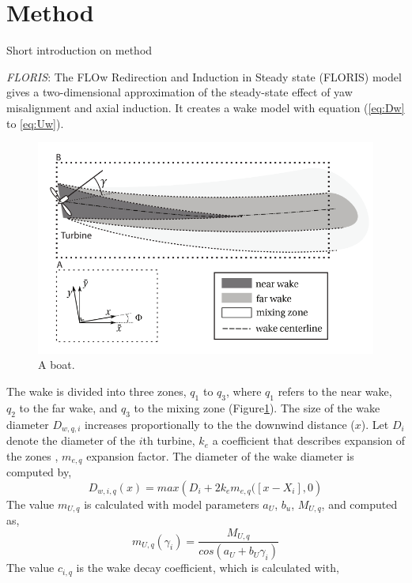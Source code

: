 \section{Method}
\label{sec:method}
	
Short introduction on method 

\textit{FLORIS}: The FLOw Redirection and Induction in Steady state (FLORIS) model gives a two-dimensional approximation of the steady-state effect of yaw misalignment and axial induction. It creates a wake model with equation (\ref{eq:Dw} to \ref{eq:Uw}). 
\begin{figure}
  	\includegraphics[width=\linewidth]{./Figures/WakeFLORIS.png}
  	\caption{A boat.}
	\label{fig:wake}
\end{figure}
The wake is divided into three zones, $q_1$ to $q_3$, where $q_1$ refers to the near wake, $q_2$ to the far wake, and $q_3$ to the mixing zone (Figure\ref{fig:wake}).
The size of the wake diameter $D_{w,q,i}$ increases proportionally to the the downwind distance ($x$). Let $D_i$ denote the diameter of the $i$th turbine, $k_e$ a coefficient that describes expansion of the zones \cite{Gebraad2016}, $m_{e,q}$ expansion factor. The diameter of the wake diameter is computed by,
\begin{equation}
\label{eq:Dw}
D_{w,i,q}(x) = max\left( {D_i + 2k_em_{e,q}([x - X_i],0} \right)
\end{equation}
The value $m_{U,q}$ is calculated with model parameters $a_U$, $b_u$, $M_{U,q}$, and computed as,
\begin{equation}
\label{eq:mU}
m_{U,q}(\gamma_i) =  \frac{M_{U,q}}{cos(a_U+b_U\gamma_i)}
\end{equation}
The value $c_{i,q}$ is the wake decay coefficient, which is calculated with,
